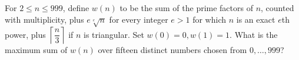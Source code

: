 For $2\le n\le999$, define $w(n)$ to be the sum of the prime factors of $n$, counted with multiplicity, plus $e\sqrt[e]{n}$ for every integer $e>1$ for which $n$ is an exact $e$th power, plus $\left\lceil\dfrac{n}{3}\right\rceil$ if $n$ is triangular. Set $w(0)=0,w(1)=1$. What is the maximum sum of $w(n)$ over fifteen distinct numbers chosen from $0,\ldots,999$?
